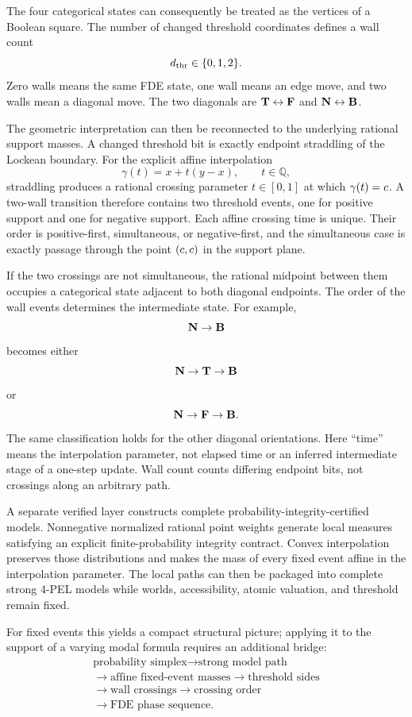 The four categorical states can consequently be treated as the vertices of a Boolean square. The number of changed threshold coordinates defines a wall count
\[
  d_{\mathrm{thr}}\in\{0,1,2\}.
\]
Zero walls means the same FDE state, one wall means an edge move, and two walls mean a diagonal move. The two diagonals are \(\mathbf{T}\leftrightarrow\mathbf{F}\) and \(\mathbf{N}\leftrightarrow\mathbf{B}\).

The geometric interpretation can then be reconnected to the underlying rational support masses. A changed threshold bit is exactly endpoint straddling of the Lockean boundary. For the explicit affine interpolation
\[
  \gamma(t)=x+t(y-x),\qquad t\in\mathbb{Q},
\]
straddling produces a rational crossing parameter \(t\in[0,1]\) at which \(\gamma(t)=c\). A two-wall transition therefore contains two threshold events, one for positive support and one for negative support. Each affine crossing time is unique. Their order is positive-first, simultaneous, or negative-first, and the simultaneous case is exactly passage through the point \((c,c)\) in the support plane.

If the two crossings are not simultaneous, the rational midpoint between them occupies a categorical state adjacent to both diagonal endpoints. The order of the wall events determines the intermediate state. For example,
\[
  \mathbf{N}\to\mathbf{B}
\]
becomes either
\[
  \mathbf{N}\to\mathbf{T}\to\mathbf{B}
\]
or
\[
  \mathbf{N}\to\mathbf{F}\to\mathbf{B}.
\]
The same classification holds for the other diagonal orientations. Here ``time'' means the interpolation parameter, not elapsed time or an inferred intermediate stage of a one-step update. Wall count counts differing endpoint bits, not crossings along an arbitrary path.

A separate verified layer constructs complete probability-integrity-certified models. Nonnegative normalized rational point weights generate local measures satisfying an explicit finite-probability integrity contract. Convex interpolation preserves those distributions and makes the mass of every fixed event affine in the interpolation parameter. The local paths can then be packaged into complete strong 4-PEL models while worlds, accessibility, atomic valuation, and threshold remain fixed.

For fixed events this yields a compact structural picture; applying it to the support of a varying modal formula requires an additional bridge:
\[
\boxed{
\begin{gathered}
\text{probability simplex}\longrightarrow\text{strong model path}\\
\longrightarrow\text{affine fixed-event masses}\longrightarrow\text{threshold sides}\\
\longrightarrow\text{wall crossings}\longrightarrow\text{crossing order}\\
\longrightarrow\text{FDE phase sequence}.
\end{gathered}}
\]

